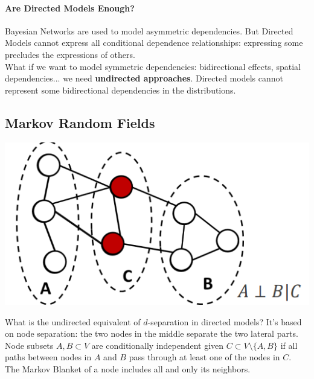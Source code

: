 \documentclass[10pt]{report}
\begin{document}
\paragraph{Are Directed Models Enough?} Bayesian Networks are used to model asymmetric dependencies. But Directed Models cannot express all conditional dependence relationships: expressing some precludes the expressions of others.\\
What if we want to model symmetric dependencies: bidirectional effects, spatial dependencies... we need \textbf{undirected approaches}. Directed models cannot represent some bidirectional dependencies in the distributions.
\subsection{Markov Random Fields}\begin{center}
	\includegraphics[scale=0.5]{24.png}
\end{center}
What is the undirected equivalent of $d$-separation in directed models? It's based on node separation: the two nodes in the middle separate the two lateral parts.\\
Node subsets $A,B\subset V$ are conditionally independent given $C\subset V\setminus \{A,B\}$ if all paths between nodes in $A$ and $B$ pass through at least one of the nodes in $C$.\\
The Markov Blanket of a node includes all and only its neighbors.
\end{document}
